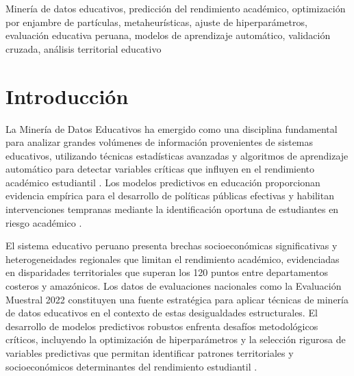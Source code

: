\documentclass[conference]{IEEEtran}
\begin{document}
\begin{abstract}
eficiencia en lectura, mientras Optuna proporciona mayor sofisticación metodológica y eficiencia en matemática. Esta equivalencia resulta especialmente relevante para instituciones educativas con recursos computacionales limitados, permitiendo selección basada en criterios operativos específicos y contribuyendo al desarrollo de sistemas de alerta temprana para identificación de estudiantes en riesgo académico.
\end{abstract}

\begin{IEEEkeywords}
Minería de datos educativos, predicción del rendimiento académico, optimización por enjambre de partículas, metaheurísticas, ajuste de hiperparámetros, evaluación educativa peruana, modelos de aprendizaje automático, validación cruzada, análisis territorial educativo
\end{IEEEkeywords}

\section{Introducción}

La Minería de Datos Educativos ha emergido como una disciplina fundamental para analizar grandes volúmenes de información provenientes de sistemas educativos, utilizando técnicas estadísticas avanzadas y algoritmos de aprendizaje automático para detectar variables críticas que influyen en el rendimiento académico estudiantil \cite{romero2020educational}. Los modelos predictivos en educación proporcionan evidencia empírica para el desarrollo de políticas públicas efectivas y habilitan intervenciones tempranas mediante la identificación oportuna de estudiantes en riesgo académico \cite{baker2014educational}.

El sistema educativo peruano presenta brechas socioeconómicas significativas y heterogeneidades regionales que limitan el rendimiento académico, evidenciadas en disparidades territoriales que superan los 120 puntos entre departamentos costeros y amazónicos. Los datos de evaluaciones nacionales como la Evaluación Muestral 2022 constituyen una fuente estratégica para aplicar técnicas de minería de datos educativos en el contexto de estas desigualdades estructurales. El desarrollo de modelos predictivos robustos enfrenta desafíos metodológicos críticos, incluyendo la optimización de hiperparámetros y la selección rigurosa de variables predictivas que permitan identificar patrones territoriales y socioeconómicos determinantes del rendimiento estudiantil \cite{dutt2017systematic}.
\end{document}

